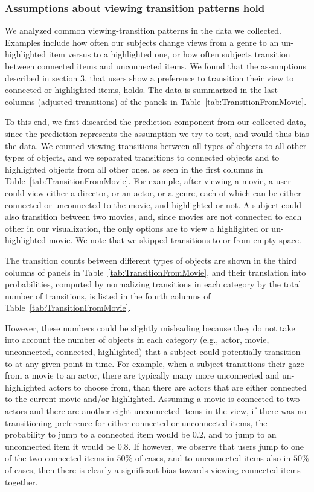 \subsubsection{Assumptions about viewing transition patterns hold}
We analyzed common viewing-transition patterns in the data we collected. Examples include how often our subjects change views from a genre to an un-highlighted item versus to a highlighted one, or how often subjects transition between connected items and unconnected items. We found that the assumptions described in section 3, that users show a preference to transition their view to connected or highlighted items, holds. The data is summarized in the last columns  (adjusted transitions) of the panels in Table~\ref{tab:TransitionFromMovie}. 

To this end, we first discarded the prediction component from our collected data, since the prediction represents the assumption we try to test, and would thus bias the data. We counted viewing transitions between all types of objects to all other types of objects, and we separated transitions to connected objects and to highlighted objects from all other ones, as seen in the first columns in Table~\ref{tab:TransitionFromMovie}.  For example, after viewing a movie, a user could view either a director, or an actor, or a genre, each of which can be either connected or unconnected to the movie, and highlighted or not. A subject could also transition between two movies, and, since movies are not connected to each other in our visualization, the only options are to view a highlighted or un-highlighted movie.  We note that we skipped transitions to or from empty space.  

The transition counts between different types of objects are shown in the third columns of panels in Table~\ref{tab:TransitionFromMovie}, and their translation into probabilities, computed by normalizing transitions in each category by the total number of transitions, is listed in the fourth columns of Table~\ref{tab:TransitionFromMovie}. 

However, these numbers could be slightly misleading because they do not take into account the number of objects in each category (e.g., actor, movie, unconnected, connected, highlighted) that a  subject could potentially transition to at any given point in time. For example, when a subject transitions their gaze from a movie to an actor, there are typically many more unconnected and un-highlighted actors to choose from, than there are actors that are either connected to the current movie and/or highlighted. Assuming a movie is connected to two actors and there are another eight unconnected items in the view, if there was no transitioning preference for either connected or unconnected items, the probability to jump to a connected item would be $0.2$, and to jump to an unconnected item it would be $0.8$. If however, we observe that users jump to one of the two connected items in $50\%$ of cases, and to unconnected items also in $50\%$ of cases, then there is clearly a significant bias towards viewing connected items together.


